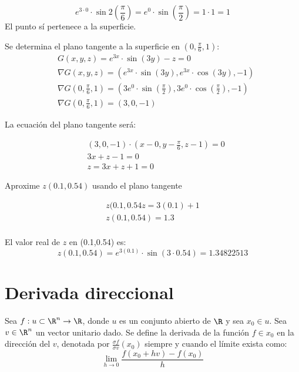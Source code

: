 \begin{equation*}
	e^{3\cdot 0}\cdot \sin{2(\frac{\pi}{6})}=e^0\cdot \sin{\left(\frac{\pi}{2}\right)}=1\cdot 1=1
\end{equation*}
El punto sí pertenece a la superficie.

Se determina el plano tangente a la superficie en $(0,\frac{\pi}{6},1)$:
\begin{align*}
	 & G(x,y,z)=e^{3x}\cdot \sin{(3y)}-z=0                                                                                                   \\
	 & \nabla G(x,y,z)=\left(e^{3x}\cdot \sin{(3y)},e^{3x}\cdot \cos{(3y)},-1\right)                                                         \\
	 & \nabla G\left(0,\frac{\pi}{6},1\right)=\left(3e^{0}\cdot \sin{(\frac{\pi}{2})},3e^{0}\cdot \cos{\left(\frac{\pi}{2}\right)},-1\right) \\
	 & \nabla G\left(0,\frac{\pi}{6},1\right)=\left(3,0,-1\right)
\end{align*}

La ecuación del plano tangente será:

\begin{align*}
	 & \left(3,0,-1\right)\cdot \left(x-0,y-\frac{\pi}{6},z-1\right)=0 \\
	 & 3x+z-1=0                                                        \\
	 & z=3x+z+1=0
\end{align*}

Aproxime $z(0.1,0.54)$ usando el plano tangente

\begin{align*}
	z(0.1,0.54z=3(0.1)+1 \\
	z(0.1,0.54)=1.3      \\
\end{align*}

El valor real de $z$ en (0.1,0.54) es:
\begin{equation*}
	z(0.1,0.54)=e^{3(0.1)}\cdot \sin{(3\cdot0.54)}=1.34822513
\end{equation*}

\section{Derivada direccional}

\begin{definition}
	Sea $f: u\subset \R^n\to \R$, donde $u$ es un conjunto abierto de $\R$ y sea $x_0\in u$.
	Sea $v\in \R^n$ un vector unitario dado. Se define la derivada de la función $f\in x_0$
	en la dirección del $v$, denotada por $\frac{\sigma f}{\sigma v}\left(x_0\right)$ siempre y cuando el límite exista como:
	\begin{equation}
		\lim_{h\to 0}\frac{f\left(x_0+hv\right)-f(x_0)}{h}
	\end{equation}
\end{definition}

